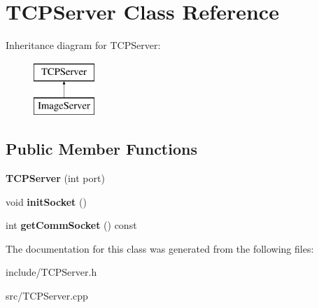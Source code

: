 \hypertarget{classTCPServer}{\section{T\-C\-P\-Server Class Reference}
\label{classTCPServer}
}
Inheritance diagram for T\-C\-P\-Server\-:\begin{figure}[H]
\begin{center}
\leavevmode
\includegraphics[height=2.000000cm]{classTCPServer}
\end{center}
\end{figure}
\subsection*{Public Member Functions}
\begin{DoxyCompactItemize}
\item 
\hypertarget{classTCPServer_a7d5e52f194a5aba475977cc2b76329c2}{{\bfseries T\-C\-P\-Server} (int port)}\label{classTCPServer_a7d5e52f194a5aba475977cc2b76329c2}

\item 
\hypertarget{classTCPServer_a603f6260d94733c013901736607daf98}{void {\bfseries init\-Socket} ()}\label{classTCPServer_a603f6260d94733c013901736607daf98}

\item 
\hypertarget{classTCPServer_a754871b150fd6dee7fef3b631e81b0fb}{int {\bfseries get\-Comm\-Socket} () const }\label{classTCPServer_a754871b150fd6dee7fef3b631e81b0fb}

\end{DoxyCompactItemize}


The documentation for this class was generated from the following files\-:\begin{DoxyCompactItemize}
\item 
include/T\-C\-P\-Server.\-h\item 
src/T\-C\-P\-Server.\-cpp\end{DoxyCompactItemize}

